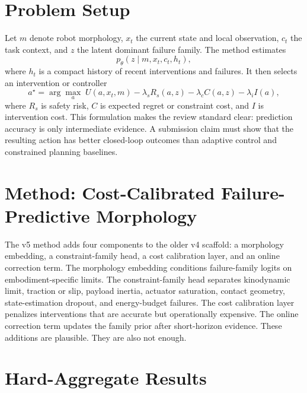 \documentclass{article}
\begin{document}
\section{Problem Setup}
Let $m$ denote robot morphology, $x_t$ the current state and local observation, $c_t$ the task context, and $z$ the latent dominant failure family. The method estimates
\[
  p_\theta(z \mid m, x_t, c_t, h_t),
\]
where $h_t$ is a compact history of recent interventions and failures. It then selects an intervention or controller
\[
  a^\star = \arg\max_a \; U(a, x_t, m) - \lambda_s R_s(a,z) - \lambda_c C(a,z) - \lambda_i I(a),
\]
where $R_s$ is safety risk, $C$ is expected regret or constraint cost, and $I$ is intervention cost. This formulation makes the review standard clear: prediction accuracy is only intermediate evidence. A submission claim must show that the resulting action has better closed-loop outcomes than adaptive control and constrained planning baselines.

\section{Method: Cost-Calibrated Failure-Predictive Morphology}
The v5 method adds four components to the older v4 scaffold: a morphology embedding, a constraint-family head, a cost calibration layer, and an online correction term. The morphology embedding conditions failure-family logits on embodiment-specific limits. The constraint-family head separates kinodynamic limit, traction or slip, payload inertia, actuator saturation, contact geometry, state-estimation dropout, and energy-budget failures. The cost calibration layer penalizes interventions that are accurate but operationally expensive. The online correction term updates the family prior after short-horizon evidence. These additions are plausible. They are also not enough.

\section{Hard-Aggregate Results}
\end{document}

